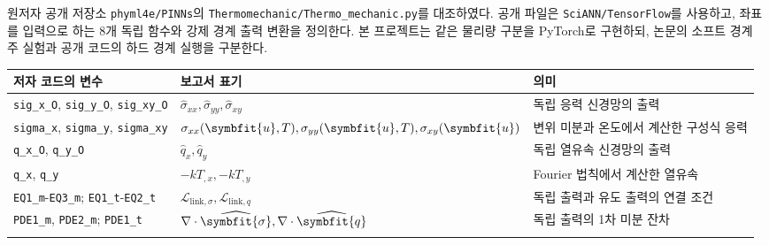 \documentclass[10pt,a4paper]{article}
\renewcommand{\boldsymbol}[1]{\symbfit{#1}}
\begin{document}
원저자 공개 저장소 \nolinkurl{phyml4e/PINNs}의 \nolinkurl{Thermomechanic/Thermo_mechanic.py}를 대조하였다. 공개 파일은 \nolinkurl{SciANN/TensorFlow}를 사용하고, 좌표를 입력으로 하는 8개 독립 함수와 강제 경계 출력 변환을 정의한다. 본 프로젝트는 같은 물리량 구분을 PyTorch로 구현하되, 논문의 소프트 경계 주 실험과 공개 코드의 하드 경계 실행을 구분한다.\par

\begingroup\small

\par\begin{minipage}{\linewidth}\begin{tabular}{>{\raggedright\arraybackslash}p{}>{\raggedright\arraybackslash}p{}>{\raggedright\arraybackslash}p{}}

\rowcolor{tint} \textbf{저자 코드의 변수} & \textbf{보고서 표기} & \textbf{의미}\\\midrule

\nolinkurl{sig_x_O}, \nolinkurl{sig_y_O}, \nolinkurl{sig_xy_O} & $\widehat\sigma_{xx},\widehat\sigma_{yy},\widehat\sigma_{xy}$ & 독립 응력 신경망의 출력\\\addlinespace[2pt]

\nolinkurl{sigma_x}, \nolinkurl{sigma_y}, \nolinkurl{sigma_xy} & $\sigma_{xx}(\boldsymbol u,T),\sigma_{yy}(\boldsymbol u,T),\sigma_{xy}(\boldsymbol u)$ & 변위 미분과 온도에서 계산한 구성식 응력\\\addlinespace[2pt]

\nolinkurl{q_x_O}, \nolinkurl{q_y_O} & $\widehat q_x,\widehat q_y$ & 독립 열유속 신경망의 출력\\\addlinespace[2pt]

\nolinkurl{q_x}, \nolinkurl{q_y} & $-kT_{,x},-kT_{,y}$ & Fourier 법칙에서 계산한 열유속\\\addlinespace[2pt]

\nolinkurl{EQ1_m}-\nolinkurl{EQ3_m}; \nolinkurl{EQ1_t}-\nolinkurl{EQ2_t} & $\mathcal L_{\mathrm{link},\sigma},\mathcal L_{\mathrm{link},q}$ & 독립 출력과 유도 출력의 연결 조건\\\addlinespace[2pt]

\nolinkurl{PDE1_m}, \nolinkurl{PDE2_m}; \nolinkurl{PDE1_t} & $\nabla\cdot\widehat{\boldsymbol\sigma},\nabla\cdot\widehat{\boldsymbol q}$ & 독립 출력의 1차 미분 잔차\\\addlinespace[2pt]

\bottomrule\end{tabular}\end{minipage}\par\vspace{5pt}\endgroup
\end{document}
